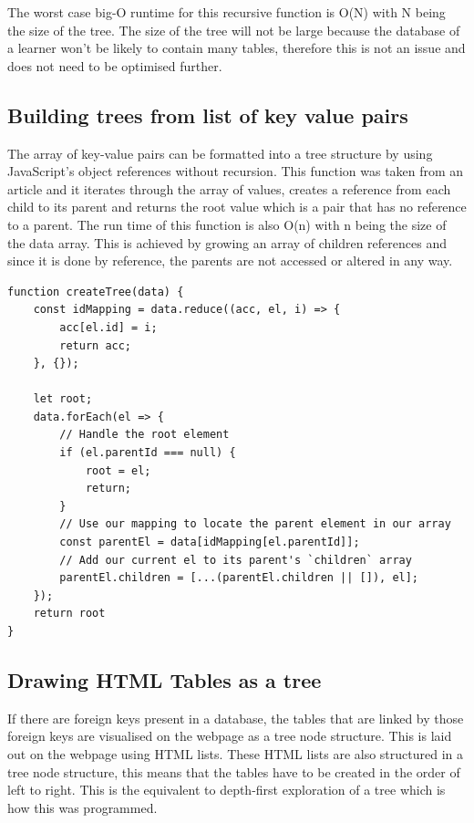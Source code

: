 The worst case big-O runtime for this recursive function is O(N) with N being the size of the tree. The size of the tree will not be large because the database of a learner won't be likely to contain many tables, therefore this is not an issue and does not need to be optimised further.

\subsection{Building trees from list of key value pairs}

The array of key-value pairs can be formatted into a tree structure by using JavaScript's object references without recursion.  This function was taken from an article \cite{references} and it iterates through the array of values, creates a reference from each child to its parent and returns the root value which is a pair that has no reference to a parent. The run time of this function is also O(n) with n being the size of the data array. This is achieved by growing an array of children references and since it is done by reference, the parents are not accessed or altered in any way.

\begin{lstlisting}[style=JavaScript, caption={JavaScript function to build a tree from a list of key value pairs.}, label={lst:tree}]
	function createTree(data) {
	const idMapping = data.reduce((acc, el, i) => {
		acc[el.id] = i;
		return acc;
	}, {});
	
	let root;
	data.forEach(el => {
		// Handle the root element
		if (el.parentId === null) {
			root = el;
			return;
		}
		// Use our mapping to locate the parent element in our array
		const parentEl = data[idMapping[el.parentId]];
		// Add our current el to its parent's `children` array
		parentEl.children = [...(parentEl.children || []), el];
	});
	return root
}
\end{lstlisting}

\subsection{Drawing HTML Tables as a tree}

If there are foreign keys present in a database, the tables that are linked by those foreign keys are visualised on the webpage as a tree node structure. This is laid out on the webpage using HTML lists. These HTML lists are also structured in a tree node structure, this means that the tables have to be created in the order of left to right. This is the equivalent to depth-first exploration of a tree which is how this was programmed. 


